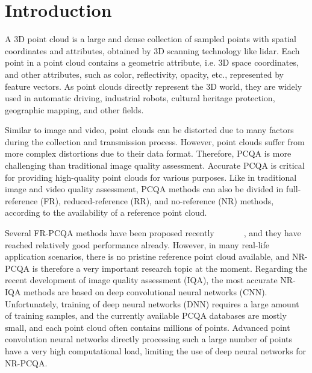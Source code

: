 \documentclass[conference]{IEEEtran}
\begin{document}
\section{Introduction}
A 3D point cloud is a large and dense collection of sampled points with spatial coordinates and attributes, obtained by 3D scanning technology like lidar. Each point in a point cloud contains a geometric attribute, i.e. 3D space coordinates, and other attributes, such as color, reflectivity, opacity, etc., represented by feature vectors. As point clouds directly represent the 3D world, they are widely used in automatic driving, industrial robots, cultural heritage protection, geographic mapping, and other fields.

Similar to image and video, point clouds can be distorted due to many factors during the collection and transmission process. However, point clouds suffer from more complex distortions due to their data format. Therefore, PCQA is more challenging than traditional image quality assessment. Accurate PCQA is critical for providing high-quality point clouds for various purposes. Like in traditional image and video quality assessment, PCQA methods can also be divided in full-reference (FR), reduced-reference (RR), and no-reference (NR) methods, according to the availability of a reference point cloud.





Several FR-PCQA methods have been proposed recently~\cite{mekuria2016evaluation}~\cite{mekuria2017performance}~\cite{meynet2020pcqm}~\cite{wang2004image}~\cite{yang2020inferring}~\cite{sheikh2006image}~\cite{liu2022perceptual}, and they have reached relatively good performance already. However, in many real-life application scenarios, there is no pristine reference point cloud available, and NR-PCQA is therefore a very important research topic at the moment. Regarding the recent development of image quality assessment (IQA), the most accurate NR-IQA methods are based on deep convolutional neural networks (CNN). Unfortunately, training of deep neural networks (DNN) requires a large amount of training samples, and the currently available PCQA databases are mostly small, and each point cloud often contains millions of points. Advanced point convolution neural networks directly processing such a large number of points have a very high computational load, limiting the use of deep neural networks for NR-PCQA.
\end{document}

